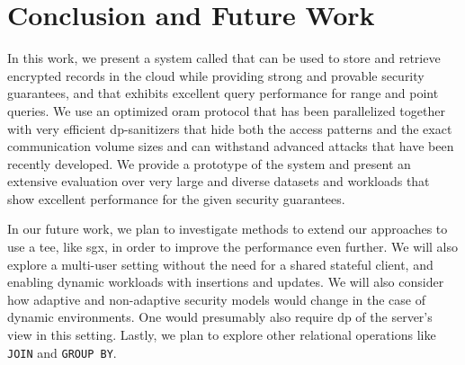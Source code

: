 \section{Conclusion and Future Work}

	In this work, we present a system called \epsolute{} that can be used to store and retrieve encrypted records in the cloud while providing strong and provable security guarantees, and that exhibits excellent query performance for range and point queries.
	We use an optimized \acrlong{oram} protocol that has been parallelized together with very efficient \acrshort{dp}-sanitizers that hide both the access patterns and the exact communication volume sizes and can withstand advanced attacks that have been recently developed.
	We provide a prototype of the system and present an extensive evaluation over very large and diverse datasets and workloads that show excellent performance for the given security guarantees.

	In our future work, we plan to investigate methods to extend our approaches to use a \acrfull{tee}, like \acrshort{sgx}, in order to improve the performance even further.
	We will also explore a multi-user setting without the need for a shared stateful client, and enabling dynamic workloads with insertions and updates.
	We will also consider how adaptive and non-adaptive security models would change in the case of dynamic environments.
	One would presumably also require \acrshort{dp} of the server's view in this setting.
	Lastly, we plan to explore other relational operations like \texttt{JOIN} and \texttt{GROUP BY}.
